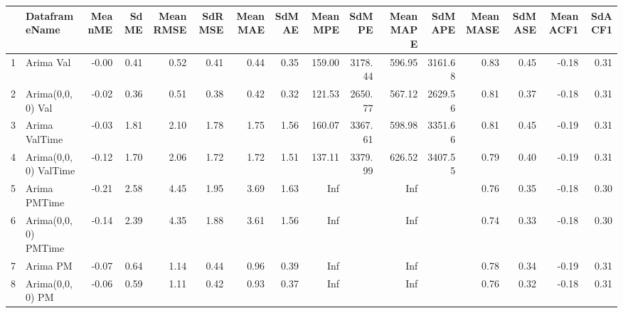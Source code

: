 \begin{table}[ht]
\centering
\begin{tabular}{rlrrrrrrrrrrrrrr}
  \hline
 & DataframeName & MeanME & SdME & MeanRMSE & SdRMSE & MeanMAE & SdMAE & MeanMPE & SdMPE & MeanMAPE & SdMAPE & MeanMASE & SdMASE & MeanACF1 & SdACF1 \\ 
  \hline
1 & Arima Val & -0.00 & 0.41 & 0.52 & 0.41 & 0.44 & 0.35 & 159.00 & 3178.44 & 596.95 & 3161.68 & 0.83 & 0.45 & -0.18 & 0.31 \\ 
  2 & Arima(0,0,0) Val & -0.02 & 0.36 & 0.51 & 0.38 & 0.42 & 0.32 & 121.53 & 2650.77 & 567.12 & 2629.56 & 0.81 & 0.37 & -0.18 & 0.31 \\ 
  3 & Arima ValTime & -0.03 & 1.81 & 2.10 & 1.78 & 1.75 & 1.56 & 160.07 & 3367.61 & 598.98 & 3351.66 & 0.81 & 0.45 & -0.19 & 0.31 \\ 
  4 & Arima(0,0,0) ValTime & -0.12 & 1.70 & 2.06 & 1.72 & 1.72 & 1.51 & 137.11 & 3379.99 & 626.52 & 3407.55 & 0.79 & 0.40 & -0.19 & 0.31 \\ 
  5 & Arima PMTime & -0.21 & 2.58 & 4.45 & 1.95 & 3.69 & 1.63 & Inf &  & Inf &  & 0.76 & 0.35 & -0.18 & 0.30 \\ 
  6 & Arima(0,0,0) PMTime & -0.14 & 2.39 & 4.35 & 1.88 & 3.61 & 1.56 & Inf &  & Inf &  & 0.74 & 0.33 & -0.18 & 0.30 \\ 
  7 & Arima PM & -0.07 & 0.64 & 1.14 & 0.44 & 0.96 & 0.39 & Inf &  & Inf &  & 0.78 & 0.34 & -0.19 & 0.31 \\ 
  8 & Arima(0,0,0) PM & -0.06 & 0.59 & 1.11 & 0.42 & 0.93 & 0.37 & Inf &  & Inf &  & 0.76 & 0.32 & -0.18 & 0.31 \\ 
   \hline
\end{tabular}
\end{table}
